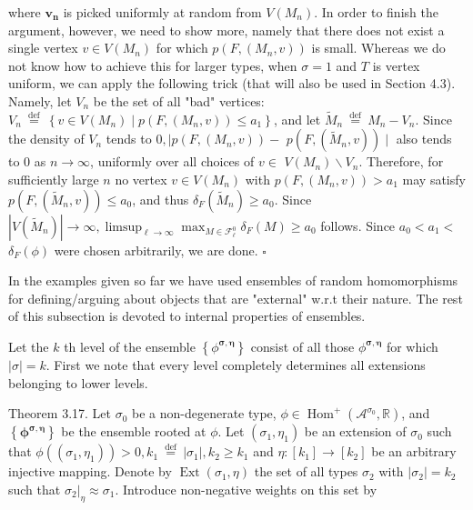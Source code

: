 \documentclass[10pt]{article}
\begin{document}
where $\boldsymbol{v}_{\boldsymbol{n}}$ is picked uniformly at random from $V\left(M_{n}\right)$. In order to finish the argument, however, we need to show more, namely that there does not exist a single vertex $v \in V\left(M_{n}\right)$ for which $p\left(F,\left(M_{n}, v\right)\right)$ is small. Whereas we do not know how to achieve this for larger types, when $\sigma=1$ and $T$ is vertex uniform, we can apply the following trick (that will also be used in Section 4.3). Namely, let $V_{n}$ be the set of all "bad" vertices: $V_{n} \stackrel{\text { def }}{=}\left\{v \in V\left(M_{n}\right) \mid p\left(F,\left(M_{n}, v\right)\right) \leq a_{1}\right\}$, and let $\widetilde{M}_{n} \stackrel{\text { def }}{=} M_{n}-V_{n}$. Since the density of $V_{n}$ tends to $0, \mid p\left(F,\left(M_{n}, v\right)\right)-$ $p\left(F,\left(\widetilde{M}_{n}, v\right)\right) \mid$ also tends to 0 as $n \longrightarrow \infty$, uniformly over all choices of $v \in$ $V\left(M_{n}\right) \backslash V_{n}$. Therefore, for sufficiently large $n$ no vertex $v \in V\left(M_{n}\right)$ with $p\left(F,\left(M_{n}, v\right)\right)>a_{1}$ may satisfy $p\left(F,\left(\widetilde{M}_{n}, v\right)\right) \leq a_{0}$, and thus $\delta_{F}\left(\widetilde{M}_{n}\right) \geq a_{0}$. Since $\left|V\left(\widetilde{M}_{n}\right)\right| \longrightarrow \infty, \limsup _{\ell \rightarrow \infty} \max _{M \in \mathcal{F}_{\ell}^{0}} \delta_{F}(M) \geq a_{0}$ follows. Since $a_{0}<a_{1}<$ $\delta_{F}(\phi)$ were chosen arbitrarily, we are done. \(\square\)

In the examples given so far we have used ensembles of random homomorphisms for defining/arguing about objects that are "external" w.r.t their nature. The rest of this subsection is devoted to internal properties of ensembles.

Let the $k$ th level of the ensemble $\left\{\phi^{\boldsymbol{\sigma}, \boldsymbol{\eta}}\right\}$ consist of all those $\phi^{\boldsymbol{\sigma}, \boldsymbol{\eta}}$ for which $|\sigma|=k$. First we note that every level completely determines all extensions belonging to lower levels.

Theorem 3.17. Let $\sigma_{0}$ be a non-degenerate type, $\phi \in \operatorname{Hom}^{+}\left(\mathcal{A}^{\sigma_{0}}, \mathbb{R}\right)$, and $\left\{\boldsymbol{\phi}^{\boldsymbol{\sigma}, \boldsymbol{\eta}}\right\}$ be the ensemble rooted at $\phi$. Let $\left(\sigma_{1}, \eta_{1}\right)$ be an extension of $\sigma_{0}$ such that $\phi\left(\left(\sigma_{1}, \eta_{1}\right)\right)>0, k_{1} \stackrel{\text { def }}{=}\left|\sigma_{1}\right|, k_{2} \geq k_{1}$ and $\eta:\left[k_{1}\right] \longrightarrow\left[k_{2}\right]$ be an arbitrary injective mapping. Denote by $\operatorname{Ext}\left(\sigma_{1}, \eta\right)$ the set of all types $\sigma_{2}$ with $\left|\sigma_{2}\right|=k_{2}$ such that $\left.\sigma_{2}\right|_{\eta} \approx \sigma_{1}$. Introduce non-negative weights on this set by
\end{document}
